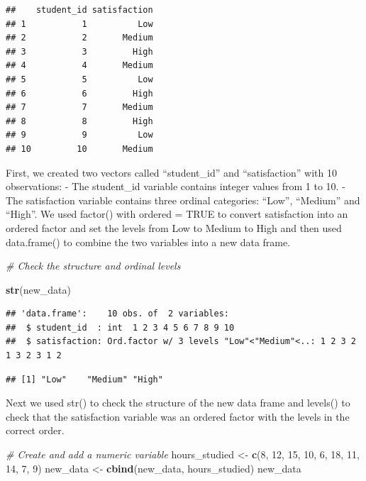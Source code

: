 \documentclass[
]{article}
\newenvironment{Shaded}{\begin{snugshade}}{\end{snugshade}}
\newcommand{\CommentTok}[1]{\textcolor[rgb]{0.56,0.35,0.01}{\textit{#1}}}
\newcommand{\DecValTok}[1]{\textcolor[rgb]{0.00,0.00,0.81}{#1}}
\newcommand{\FunctionTok}[1]{\textcolor[rgb]{0.13,0.29,0.53}{\textbf{#1}}}
\newcommand{\NormalTok}[1]{#1}
\newcommand{\OtherTok}[1]{\textcolor[rgb]{0.56,0.35,0.01}{#1}}
\newcommand{\SpecialCharTok}[1]{\textcolor[rgb]{0.81,0.36,0.00}{\textbf{#1}}}
\begin{document}
\begin{verbatim}
##    student_id satisfaction
## 1           1          Low
## 2           2       Medium
## 3           3         High
## 4           4       Medium
## 5           5          Low
## 6           6         High
## 7           7       Medium
## 8           8         High
## 9           9          Low
## 10         10       Medium
\end{verbatim}

First, we created two vectors called ``student\_id'' and
``satisfaction'' with 10 observations: - The student\_id variable
contains integer values from 1 to 10. - The satisfaction variable
contains three ordinal categories: ``Low'', ``Medium'' and ``High''. We
used factor() with ordered = TRUE to convert satisfaction into an
ordered factor and set the levels from Low to Medium to High and then
used data.frame() to combine the two variables into a new data frame.

\begin{Shaded}
\begin{Highlighting}[]
\CommentTok{\# Check the structure and ordinal levels}

\FunctionTok{str}\NormalTok{(new\_data)}
\end{Highlighting}
\end{Shaded}

\begin{verbatim}
## 'data.frame':    10 obs. of  2 variables:
##  $ student_id  : int  1 2 3 4 5 6 7 8 9 10
##  $ satisfaction: Ord.factor w/ 3 levels "Low"<"Medium"<..: 1 2 3 2 1 3 2 3 1 2
\end{verbatim}

\begin{Shaded}
\end{Shaded}

\begin{verbatim}
## [1] "Low"    "Medium" "High"
\end{verbatim}

Next we used str() to check the structure of the new data frame and
levels() to check that the satisfaction variable was an ordered factor
with the levels in the correct order.

\begin{Shaded}
\begin{Highlighting}[]
\CommentTok{\# Create and add a numeric variable}
\NormalTok{hours\_studied }\OtherTok{\textless{}{-}} \FunctionTok{c}\NormalTok{(}\DecValTok{8}\NormalTok{, }\DecValTok{12}\NormalTok{, }\DecValTok{15}\NormalTok{, }\DecValTok{10}\NormalTok{, }\DecValTok{6}\NormalTok{, }\DecValTok{18}\NormalTok{, }\DecValTok{11}\NormalTok{, }\DecValTok{14}\NormalTok{, }\DecValTok{7}\NormalTok{, }\DecValTok{9}\NormalTok{)}
\NormalTok{new\_data }\OtherTok{\textless{}{-}} \FunctionTok{cbind}\NormalTok{(new\_data, hours\_studied)}
\NormalTok{new\_data}
\end{Highlighting}
\end{Shaded}
\end{document}
